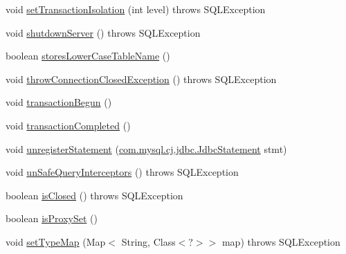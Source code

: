 \begin{DoxyCompactItemize}
\item 
void \mbox{\hyperlink{classcom_1_1mysql_1_1cj_1_1jdbc_1_1ha_1_1_multi_host_my_s_q_l_connection_a964a955b8f15fd5214fd1819d3d5f221}{set\+Transaction\+Isolation}} (int level)  throws S\+Q\+L\+Exception 
\item 
void \mbox{\hyperlink{classcom_1_1mysql_1_1cj_1_1jdbc_1_1ha_1_1_multi_host_my_s_q_l_connection_a33803a0494610eb6148a4d8c1c9b046a}{shutdown\+Server}} ()  throws S\+Q\+L\+Exception 
\item 
boolean \mbox{\hyperlink{classcom_1_1mysql_1_1cj_1_1jdbc_1_1ha_1_1_multi_host_my_s_q_l_connection_a4e21f3528706c1fa46892225a4d3fadc}{stores\+Lower\+Case\+Table\+Name}} ()
\item 
void \mbox{\hyperlink{classcom_1_1mysql_1_1cj_1_1jdbc_1_1ha_1_1_multi_host_my_s_q_l_connection_a64a4422602f35d48399a5326cc57cd0c}{throw\+Connection\+Closed\+Exception}} ()  throws S\+Q\+L\+Exception 
\item 
void \mbox{\hyperlink{classcom_1_1mysql_1_1cj_1_1jdbc_1_1ha_1_1_multi_host_my_s_q_l_connection_a48baee82b32b4bc2f20948b1fd5f1832}{transaction\+Begun}} ()
\item 
void \mbox{\hyperlink{classcom_1_1mysql_1_1cj_1_1jdbc_1_1ha_1_1_multi_host_my_s_q_l_connection_af59a5f954f0a1acc76d01d042728dc21}{transaction\+Completed}} ()
\item 
void \mbox{\hyperlink{classcom_1_1mysql_1_1cj_1_1jdbc_1_1ha_1_1_multi_host_my_s_q_l_connection_ac197efeaf30947cdeb66f8bcdd49addf}{unregister\+Statement}} (\mbox{\hyperlink{interfacecom_1_1mysql_1_1cj_1_1jdbc_1_1_jdbc_statement}{com.\+mysql.\+cj.\+jdbc.\+Jdbc\+Statement}} stmt)
\item 
void \mbox{\hyperlink{classcom_1_1mysql_1_1cj_1_1jdbc_1_1ha_1_1_multi_host_my_s_q_l_connection_aeeb54105383b042016aae9546a2362e2}{un\+Safe\+Query\+Interceptors}} ()  throws S\+Q\+L\+Exception 
\item 
boolean \mbox{\hyperlink{classcom_1_1mysql_1_1cj_1_1jdbc_1_1ha_1_1_multi_host_my_s_q_l_connection_ab9c60b559691695b22bed5012ebdf9c4}{is\+Closed}} ()  throws S\+Q\+L\+Exception 
\item 
boolean \mbox{\hyperlink{classcom_1_1mysql_1_1cj_1_1jdbc_1_1ha_1_1_multi_host_my_s_q_l_connection_a1fc6293e6251ae130d1444c288a60031}{is\+Proxy\+Set}} ()
\item 
void \mbox{\hyperlink{classcom_1_1mysql_1_1cj_1_1jdbc_1_1ha_1_1_multi_host_my_s_q_l_connection_a98ac07aa58b7cd26cae37b2d4c5f0893}{set\+Type\+Map}} (Map$<$ String, Class$<$?$>$$>$ map)  throws S\+Q\+L\+Exception 
\item 
$$
\end{DoxyCompactItemize}
